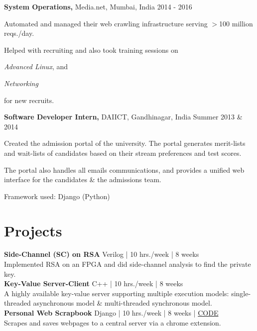 \documentclass[margin]{res}
\newcommand{\daiict}{\textsc{DAIICT}}
\begin{document}
\begin{resume}
{\bf System Operations,} Media.net, Mumbai, India
\hfill 2014 - 2016 %
\begin{itemizeexp}
    \item Automated and managed their web crawling infrastructure serving
    $>$100 million reqs./day.
    \item Helped with recruiting and also took training sessions on 
    \begin{enumerate*}[label=(\roman*)]
      \item \textit{Advanced Linux}, and
      \item \textit{Networking}
    \end{enumerate*}
    for new recruits.
\end{itemizeexp}

{\bf Software Developer Intern,} \daiict, Gandhinagar, India
\hfill Summer 2013 \& 2014 %
\begin{itemizeexp}
    \item Created the admission portal of the university. The portal generates
    merit-lists and wait-lists of candidates based on their stream preferences
    and test scores.
    \item The portal also handles all emails communications, and provides a unified web interface for the candidates \& the admissions team.
    \item Framework used: Django (Python)
\end{itemizeexp}

\section{Projects}
{\bfseries Side-Channel (SC) on RSA}\hfill
{\small Verilog | 10 hrs./week | 8 weeks}\\
Implemented RSA on an FPGA and did side-channel analysis to find the private key.\\[2ex]

{\bfseries Key-Value Server-Client}\hfill
{\small C++ | 10 hrs./week | 8 weeks}\\
A highly available key-value server supporting multiple execution models:
single-threaded asynchronous model \& multi-threaded synchronous model.\\[2ex]

{\bfseries Personal Web Scrapbook}\hfill
{\small Django | 10 hrs./week | 8 weeks | \href{https://bitbucket.org/mitthu/capsule/src/}{CODE}}\\
Scrapes and saves webpages to a central server via a chrome extension.\\[2ex]


\end{resume}
\end{document}
